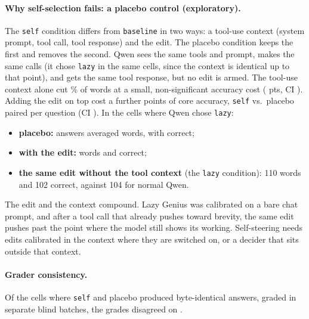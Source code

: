 \paragraph{Why self-selection fails: a placebo control (exploratory).} The \texttt{self} condition differs from \texttt{baseline} in two ways: a tool-use context (system prompt, tool call, tool response) and the edit. The placebo condition keeps the first and removes the second. Qwen sees the same tools and prompt, makes the same calls (it chose \texttt{lazy} in the same \PlaceboChosen{} cells, since the context is identical up to that point), and gets the same tool response, but no edit is armed. The tool-use context alone cut \PlaceboWords\% of words at a small, non-significant accuracy cost (\PlaceboCore{} pts, CI \PlaceboCoreCI). Adding the edit on top cost a further \SelfMinusPlacebo{} points of core accuracy, \texttt{self} vs.\ placebo paired per question (CI \SelfMinusPlaceboCI). In the \ChosenN{} cells where Qwen chose \texttt{lazy}:
\begin{itemize}
\item \textbf{placebo:} answers averaged \ChosenPlaceboWords{} words, with \ChosenPlaceboCore{} correct;
\item \textbf{with the edit:} \ChosenSelfWords{} words and \ChosenSelfCore{} correct;
\item \textbf{the same edit without the tool context} (the \texttt{lazy} condition): 110 words and 102 correct, against 104 for normal Qwen.
\end{itemize}
The edit and the context compound. Lazy Genius was calibrated on a bare chat prompt, and after a tool call that already pushes toward brevity, the same edit pushes past the point where the model still shows its working. Self-steering needs edits calibrated in the context where they are switched on, or a decider that sits outside that context.

\paragraph{Grader consistency.} Of the \DupN{} cells where \texttt{self} and placebo produced byte-identical answers, graded in separate blind batches, the grades disagreed on \DupMismatch.
